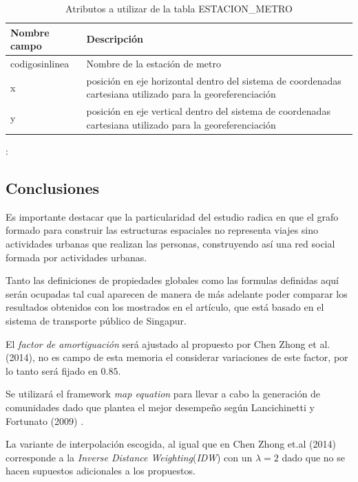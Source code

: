 \documentclass[12pt]{article}
\begin{document}

\begin{table}[H]
\begin{center}
  \begin{tabular}{| l | p{7cm} |}
    \hline
    Nombre campo & Descripción \\ \hline \hline
    codigosinlinea & Nombre de la estación de metro \\ \hline
    x & posición en eje horizontal dentro del sistema de coordenadas cartesiana utilizado para la georeferenciación \\ \hline
    y & posición en eje vertical dentro del sistema de coordenadas cartesiana utilizado para la georeferenciación \\ \hline
  \end{tabular}
\end{center}
\caption{Atributos a utilizar de la tabla ESTACION\_METRO}:
\label{tabla:estacion_metro}
\end{table}


    \subsection{Conclusiones}
    
	Es importante destacar que la particularidad del estudio radica en que el grafo formado para construir las estructuras espaciales no representa viajes sino actividades urbanas que realizan las personas, construyendo así una red social formada por actividades urbanas.
	
	Tanto las definiciones de propiedades globales como las formulas definidas aquí serán ocupadas tal cual aparecen de manera de más adelante poder comparar los resultados obtenidos con los mostrados en el artículo, que está basado en el sistema de transporte público de Singapur.

	El \textit{factor de amortiguación} será ajustado al propuesto por Chen Zhong et al. (2014)\cite{Estructura_urbana}, no es campo de esta memoria el considerar variaciones de este factor, por lo tanto será fijado en $0.85$.

	Se utilizará el framework \textit{map equation}	 para llevar a cabo la generación de comunidades dado que plantea el mejor desempeño según Lancichinetti y Fortunato (2009) \cite{Comparar_generador_comunidad}.
	
La variante de interpolación escogida, al igual que en Chen Zhong et.al (2014) corresponde a la \textit{Inverse Distance Weighting}(\textit{IDW}) con un $\lambda=2$ dado que no se hacen supuestos adicionales a los propuestos.
	
\end{document}
